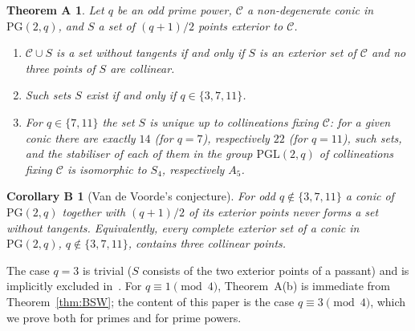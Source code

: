 \documentclass[11pt]{amsart}
\newtheorem*{maintheorem}{Theorem A}
\newtheorem*{maincorollary}{Corollary B}
\theoremstyle{definition}
\theoremstyle{remark}
\numberwithin{equation}{section}
\newcommand{\PGtwo}{\mathrm{PG}(2,q)}
\newcommand{\PGL}{\mathrm{PGL}(2,q)}
\newcommand{\Con}{\mathcal{C}}
\begin{document}
\begin{maintheorem}
Let $q$ be an odd prime power, $\Con$ a non-degenerate conic in $\PGtwo$, and $S$ a set of $(q+1)/2$ points exterior to $\Con$.
\begin{enumerate}
\item[(a)] $\Con\cup S$ is a set without tangents if and only if $S$ is an exterior set of $\Con$ and no three points of $S$ are
collinear.
\item[(b)] Such sets $S$ exist if and only if $q\in\{3,7,11\}$.
\item[(c)] For $q\in\{7,11\}$ the set $S$ is unique up to collineations fixing $\Con$: for a given conic there are exactly $14$
(for $q=7$), respectively $22$ (for $q=11$), such sets, and the stabiliser of each of them in the group $\PGL$ of collineations
fixing $\Con$ is isomorphic to $S_4$, respectively $A_5$.
\end{enumerate}
\end{maintheorem}

\begin{maincorollary}[Van de Voorde's conjecture]
For odd $q\notin\{3,7,11\}$ a conic of $\PGtwo$ together with $(q+1)/2$ of its exterior points never forms a set without
tangents. Equivalently, every complete exterior set of a conic in $\PGtwo$, $q\notin\{3,7,11\}$, contains three collinear
points.
\end{maincorollary}

The case $q=3$ is trivial ($S$ consists of the two exterior points of a passant) and is implicitly excluded
in~\cite{VdV}. For $q\equiv1\pmod4$, Theorem~A(b) is immediate from Theorem~\ref{thm:BSW}; the content of this paper is the
case $q\equiv3\pmod4$, which we prove both for primes and for prime powers.
\end{document}
